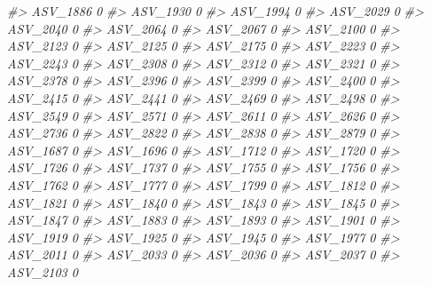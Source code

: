 \documentclass[
]{article}
\newenvironment{Shaded}{\begin{snugshade}}{\end{snugshade}}
\newcommand{\CommentTok}[1]{\textcolor[rgb]{0.56,0.35,0.01}{\textit{#1}}}
\begin{document}
\begin{Shaded}
\begin{Highlighting}[]
\CommentTok{\#\textgreater{} ASV\_1886  0}
\CommentTok{\#\textgreater{} ASV\_1930  0}
\CommentTok{\#\textgreater{} ASV\_1994  0}
\CommentTok{\#\textgreater{} ASV\_2029  0}
\CommentTok{\#\textgreater{} ASV\_2040  0}
\CommentTok{\#\textgreater{} ASV\_2064  0}
\CommentTok{\#\textgreater{} ASV\_2067  0}
\CommentTok{\#\textgreater{} ASV\_2100  0}
\CommentTok{\#\textgreater{} ASV\_2123  0}
\CommentTok{\#\textgreater{} ASV\_2125  0}
\CommentTok{\#\textgreater{} ASV\_2175  0}
\CommentTok{\#\textgreater{} ASV\_2223  0}
\CommentTok{\#\textgreater{} ASV\_2243  0}
\CommentTok{\#\textgreater{} ASV\_2308  0}
\CommentTok{\#\textgreater{} ASV\_2312  0}
\CommentTok{\#\textgreater{} ASV\_2321  0}
\CommentTok{\#\textgreater{} ASV\_2378  0}
\CommentTok{\#\textgreater{} ASV\_2396  0}
\CommentTok{\#\textgreater{} ASV\_2399  0}
\CommentTok{\#\textgreater{} ASV\_2400  0}
\CommentTok{\#\textgreater{} ASV\_2415  0}
\CommentTok{\#\textgreater{} ASV\_2441  0}
\CommentTok{\#\textgreater{} ASV\_2469  0}
\CommentTok{\#\textgreater{} ASV\_2498  0}
\CommentTok{\#\textgreater{} ASV\_2549  0}
\CommentTok{\#\textgreater{} ASV\_2571  0}
\CommentTok{\#\textgreater{} ASV\_2611  0}
\CommentTok{\#\textgreater{} ASV\_2626  0}
\CommentTok{\#\textgreater{} ASV\_2736  0}
\CommentTok{\#\textgreater{} ASV\_2822  0}
\CommentTok{\#\textgreater{} ASV\_2838  0}
\CommentTok{\#\textgreater{} ASV\_2879  0}
\CommentTok{\#\textgreater{} ASV\_1687  0}
\CommentTok{\#\textgreater{} ASV\_1696  0}
\CommentTok{\#\textgreater{} ASV\_1712  0}
\CommentTok{\#\textgreater{} ASV\_1720  0}
\CommentTok{\#\textgreater{} ASV\_1726  0}
\CommentTok{\#\textgreater{} ASV\_1737  0}
\CommentTok{\#\textgreater{} ASV\_1755  0}
\CommentTok{\#\textgreater{} ASV\_1756  0}
\CommentTok{\#\textgreater{} ASV\_1762  0}
\CommentTok{\#\textgreater{} ASV\_1777  0}
\CommentTok{\#\textgreater{} ASV\_1799  0}
\CommentTok{\#\textgreater{} ASV\_1812  0}
\CommentTok{\#\textgreater{} ASV\_1821  0}
\CommentTok{\#\textgreater{} ASV\_1840  0}
\CommentTok{\#\textgreater{} ASV\_1843  0}
\CommentTok{\#\textgreater{} ASV\_1845  0}
\CommentTok{\#\textgreater{} ASV\_1847  0}
\CommentTok{\#\textgreater{} ASV\_1883  0}
\CommentTok{\#\textgreater{} ASV\_1893  0}
\CommentTok{\#\textgreater{} ASV\_1901  0}
\CommentTok{\#\textgreater{} ASV\_1919  0}
\CommentTok{\#\textgreater{} ASV\_1925  0}
\CommentTok{\#\textgreater{} ASV\_1945  0}
\CommentTok{\#\textgreater{} ASV\_1977  0}
\CommentTok{\#\textgreater{} ASV\_2011  0}
\CommentTok{\#\textgreater{} ASV\_2033  0}
\CommentTok{\#\textgreater{} ASV\_2036  0}
\CommentTok{\#\textgreater{} ASV\_2037  0}
\CommentTok{\#\textgreater{} ASV\_2103  0}

\end{Highlighting}
\end{Shaded}
\end{document}
